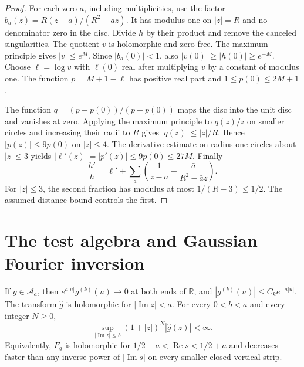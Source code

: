 \documentclass[11pt]{article}
\numberwithin{equation}{section}
\newcommand{\R}{\mathbb R}
\newcommand{\A}{\mathcal A}
\begin{document}
\begin{proof}
For each zero $a$, including multiplicities, use the factor
$b_a(z)=R(z-a)/(R^2-\bar a z)$.
It has modulus one on $|z|=R$ and no denominator zero in the disc.
Divide $h$ by their product and remove the canceled singularities.
The quotient $v$ is holomorphic and zero-free.
The maximum principle gives $|v|\leq e^M$.
Since $|b_a(0)|<1$, also $|v(0)|\geq|h(0)|\geq e^{-M}$.
Choose $\ell=\log v$ with $\ell(0)$ real after multiplying $v$ by a constant
of modulus one.  The function $p=M+1-\ell$ has positive real part and
$1\leq p(0)\leq2M+1$.

The function $q=(p-p(0))/(p+p(0))$ maps the disc into the unit disc and
vanishes at zero.  Applying the maximum principle to $q(z)/z$ on smaller
circles and increasing their radii to $R$ gives $|q(z)|\leq|z|/R$.
Hence $|p(z)|\leq9p(0)$ on $|z|\leq4$.
The derivative estimate on radius-one circles about $|z|\leq3$ yields
$|\ell'(z)|=|p'(z)|\leq9p(0)\leq27M$.
Finally
\[
 \frac{h'}h=\ell'+\sum_a
 \left(\frac1{z-a}+\frac{\bar a}{R^2-\bar a z}\right).
\]
For $|z|\leq3$, the second fraction has modulus at most $1/(R-3)\leq1/2$.
The assumed distance bound controls the first.
\end{proof}

\section{The test algebra and Gaussian Fourier inversion}
\label{sec:tests}

\begin{lemma}
\label{lem:test-bounds}
If $g\in\A_a$, then $e^{a|u|}g^{(k)}(u)\to0$ at both ends of $\R$,
and $|g^{(k)}(u)|\leq C_k e^{-a|u|}$.
The transform $\widehat g$ is holomorphic for $|\operatorname{Im}z|<a$.
For every $0<b<a$ and every integer $N\geq0$,
\begin{equation}
 \sup_{|\operatorname{Im}z|\leq b}(1+|z|)^N|\widehat g(z)|<\infty.
 \label{eq:strip-decay}
\end{equation}
Equivalently, $F_g$ is holomorphic for $1/2-a<\operatorname{Re}s<1/2+a$
and decreases faster than any inverse power of $|\operatorname{Im}s|$
on every smaller closed vertical strip.
\end{lemma}
\end{document}
